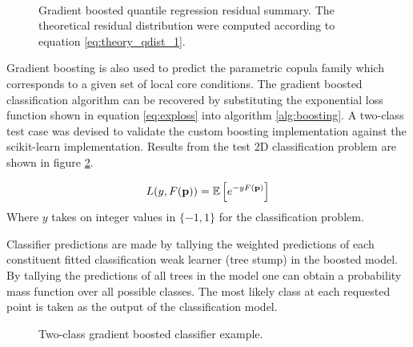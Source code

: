 \begin{figure}[H]%
    \centering
    \hspace*{-1.0em}%
    \hspace*{-1.0em}%
    \\
    \hspace*{-1.0em}%
    \hspace*{-1.0em}%
    \caption[Gradient boosted quantile regression residual summary.]{Gradient boosted quantile regression residual summary.  The theoretical residual distribution were computed according to equation \ref{eq:theory_qdist_1}.} %
    \label{fig:gb2}%
\end{figure}

Gradient boosting is also used to predict the parametric copula family which corresponds to a given set of local core conditions.  The gradient boosted classification algorithm can be recovered by substituting the exponential loss function shown in equation \ref{eq:exploss} into algorithm \ref{alg:boosting}.   A two-class test case was devised to validate the custom boosting implementation against the scikit-learn implementation.  Results from the test 2D classification problem are shown in figure \ref{fig:gb3}.

\begin{equation}
L(y, F(\mathbf p)) = \operatorname*{\mathbb{E}} \left[ e^{-yF(\mathbf p)}\right]
\label{eq:exploss}
\end{equation}
Where $y$ takes on integer values in $\{-1, 1\}$ for the classification problem.

Classifier predictions are made by tallying the weighted predictions of each constituent fitted classification weak learner (tree stump) in the boosted model.  By tallying the predictions of all trees in the model one can obtain a probability mass function over all possible classes.  The most likely class at each requested point is taken as the output of the classification model.

\begin{figure}[H]%
    \centering
    \hspace*{-1.0em}%
    \caption{Two-class gradient boosted classifier example.}%
    \label{fig:gb3}%
\end{figure}

